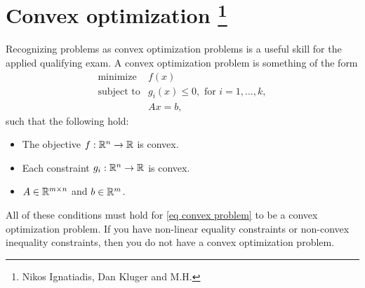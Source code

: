 \section{Convex optimization \footnote{Nikos Ignatiadis, Dan Kluger and M.H.}}\label{sec:Opt_review}

Recognizing problems as convex optimization problems is a useful skill for the applied qualifying exam. A convex optimization problem is something of the form
\begin{equation}\label{eq convex problem}
    \begin{array}{ll}
        \mbox{minimize} & f(x)\\
        \mbox{subject to} & g_i(x) \le 0, \text{ for } i=1,\ldots,k,\\
        & Ax = b,
    \end{array}
\end{equation}
such that the following hold:
\begin{itemize}
    \item The objective $f:\mathbb{R}^n \to \mathbb{R}$ is convex.
    \item Each constraint $g_i : \mathbb{R}^n \to \mathbb{R}$ is convex.
    \item $A\in \mathbb{R}^{m\times n}$ and $b \in \mathbb{R}^m$.
\end{itemize}
All of these conditions must hold for \eqref{eq convex problem} to be a convex optimization problem. If you have non-linear equality constraints or non-convex inequality constraints, then you do not have a convex optimization problem. 

